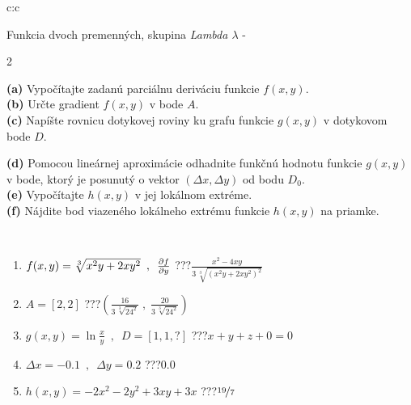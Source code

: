 \documentclass[10pt]{report}
\begin{document}
\begin{tabular}{c:c}
\begin{minipage}[c][104.5mm][t]{0.5\linewidth}
\begin{center}
\vspace{7mm}
{\huge \LARGE Funkcia dvoch premenných, skupina \textit{Lambda $\lambda$} -}\\[5mm]
\begin{minipage}{0.95\linewidth}
\begin{center}
{\small \begin{multicols}{2} \raggedright
\textbf{(a)} Vypočítajte zadanú parciálnu deriváciu funkcie \(f(x,y)\). \\[1mm]
\textbf{(b)} Určte gradient \(f(x,y)\) v bode \(A\). \\[1mm]
\textbf{(c)} Napíšte rovnicu dotykovej roviny ku grafu funkcie \(g(x,y)\) v dotykovom bode \(D\). \par \columnbreak
\textbf{(d)} Pomocou lineárnej aproximácie odhadnite funkčnú hodnotu funkcie \(g(x,y)\) v bode, ktorý je posunutý o vektor \((\Delta x, \Delta y)\) od bodu \(D_0\). \\[1mm]
\textbf{(e)} Vypočítajte \(h(x,y)\) v jej lokálnom extréme. \\[1mm]
\textbf{(f)} Nájdite bod viazeného lokálneho extrému funkcie \(h(x,y)\) na priamke. \\[1mm]
\end{multicols}
}
\end{center}
\end{minipage}
\\[4mm]
\begin{minipage}{0.79\linewidth}
\begin{center}
\begin{varwidth}{\linewidth}
\begin{enumerate}
\normalsizerr
\item $f(x,y) = \sqrt[3]{x^2y + 2xy^2}\enspace , \enspace \pdv{f}{y}$\quad \dotfill\; ???\;\dotfill \quad $\frac{x^2-4xy}{3\,\sqrt[3]{(x^2y+2xy^2)^{2}}}$
\item $A = [2, 2]$\quad \dotfill\; ???\;\dotfill \quad $\left( \frac{16}{3\,\sqrt[3]{24^2}} \;,\; \frac{20}{3\,\sqrt[3]{24^2}} \right)$
\item $g(x,y) = \ln\frac{x}{y} \enspace , \enspace D=[1,1,?]$\quad \dotfill\; ???\;\dotfill \quad $x + y + z + 0 = 0$
\item $\Delta x = {-0.1} \enspace,\enspace \Delta y = {0.2}$\quad \dotfill\; ???\;\dotfill \quad $0.0$
\item $h(x,y) = -2x^2-2y^2+3xy+3x$\quad \dotfill\; ???\;\dotfill \quad $\nicefrac{19}{7}$

\end{enumerate}
\end{varwidth}
\end{center}
\end{minipage}
\end{center}
\end{minipage}
\end{tabular}
\end{document}
